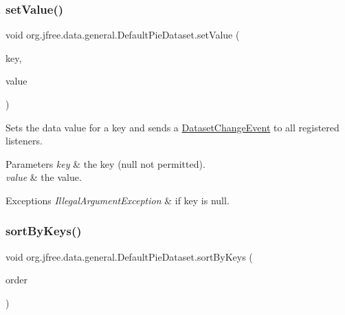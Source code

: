 \subsubsection{\texorpdfstring{set\+Value()}{setValue()}\hspace{0.1cm}{\footnotesize\ttfamily [2/2]}}
{\footnotesize\ttfamily void org.\+jfree.\+data.\+general.\+Default\+Pie\+Dataset.\+set\+Value (\begin{DoxyParamCaption}\item[{Comparable}]{key,  }\item[{double}]{value }\end{DoxyParamCaption})}

Sets the data value for a key and sends a \mbox{\hyperlink{classorg_1_1jfree_1_1data_1_1general_1_1_dataset_change_event}{Dataset\+Change\+Event}} to all registered listeners.


\begin{DoxyParams}{Parameters}
{\em key} & the key ({\ttfamily null} not permitted). \\
\hline
{\em value} & the value.\\
\hline
\end{DoxyParams}

\begin{DoxyExceptions}{Exceptions}
{\em Illegal\+Argument\+Exception} & if {\ttfamily key} is {\ttfamily null}. \\
\hline
\end{DoxyExceptions}
\mbox{\label{classorg_1_1jfree_1_1data_1_1general_1_1_default_pie_dataset_a6bbf301f91b8872cb0a23c3905cc7ab3}} 
\subsubsection{\texorpdfstring{sort\+By\+Keys()}{sortByKeys()}}
{\footnotesize\ttfamily void org.\+jfree.\+data.\+general.\+Default\+Pie\+Dataset.\+sort\+By\+Keys (\begin{DoxyParamCaption}\item[{Sort\+Order}]{order }\end{DoxyParamCaption})}

